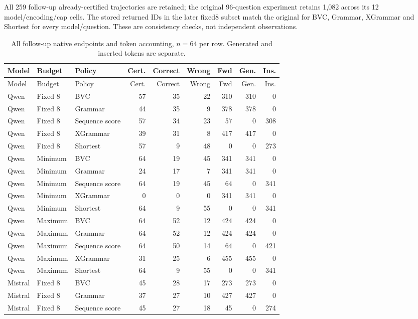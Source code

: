\documentclass[12pt,a4paper]{article}
\begin{document}
All 259 follow-up already-certified trajectories are retained; the original 96-question experiment retains 1,082 across its 12 model/encoding/cap cells. The stored returned IDs in the later fixed8 subset match the original for BVC, Grammar, XGrammar and Shortest for every model/question. These are consistency checks, not independent observations.
\begin{longtable}{@{}lllrrrrrr@{}}
\caption{All follow-up native endpoints and token accounting, $n=64$ per row. Generated and inserted tokens are separate.}\label{tab:full}\\
\toprule
Model & Budget & Policy & Cert. & Correct & Wrong & Fwd & Gen. & Ins. \\
\midrule
\endfirsthead
\toprule
Model & Budget & Policy & Cert. & Correct & Wrong & Fwd & Gen. & Ins. \\
\midrule
\endhead
Qwen & Fixed 8 & BVC & 57 & 35 & 22 & 310 & 310 & 0 \\
Qwen & Fixed 8 & Grammar & 44 & 35 & 9 & 378 & 378 & 0 \\
Qwen & Fixed 8 & Sequence score & 57 & 34 & 23 & 57 & 0 & 308 \\
Qwen & Fixed 8 & XGrammar & 39 & 31 & 8 & 417 & 417 & 0 \\
Qwen & Fixed 8 & Shortest & 57 & 9 & 48 & 0 & 0 & 273 \\
Qwen & Minimum & BVC & 64 & 19 & 45 & 341 & 341 & 0 \\
Qwen & Minimum & Grammar & 24 & 17 & 7 & 341 & 341 & 0 \\
Qwen & Minimum & Sequence score & 64 & 19 & 45 & 64 & 0 & 341 \\
Qwen & Minimum & XGrammar & 0 & 0 & 0 & 341 & 341 & 0 \\
Qwen & Minimum & Shortest & 64 & 9 & 55 & 0 & 0 & 341 \\
Qwen & Maximum & BVC & 64 & 52 & 12 & 424 & 424 & 0 \\
Qwen & Maximum & Grammar & 64 & 52 & 12 & 424 & 424 & 0 \\
Qwen & Maximum & Sequence score & 64 & 50 & 14 & 64 & 0 & 421 \\
Qwen & Maximum & XGrammar & 31 & 25 & 6 & 455 & 455 & 0 \\
Qwen & Maximum & Shortest & 64 & 9 & 55 & 0 & 0 & 341 \\
Mistral & Fixed 8 & BVC & 45 & 28 & 17 & 273 & 273 & 0 \\
Mistral & Fixed 8 & Grammar & 37 & 27 & 10 & 427 & 427 & 0 \\
Mistral & Fixed 8 & Sequence score & 45 & 27 & 18 & 45 & 0 & 274 \\

\end{longtable}
\end{document}
